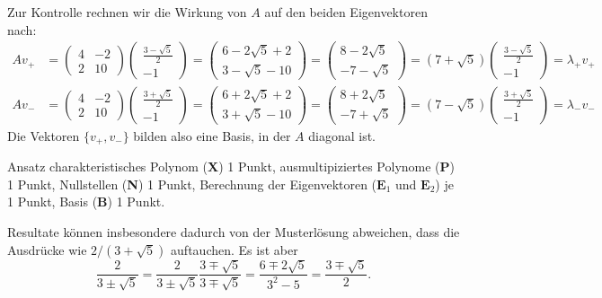 \begin{loesung}
Zur Kontrolle rechnen wir die Wirkung von $A$ auf den beiden Eigenvektoren
nach:
\begin{align*}
Av_+
&=
\begin{pmatrix}4&-2\\2&10\end{pmatrix}
\begin{pmatrix}
\frac{3-\sqrt{5}}2\\-1
\end{pmatrix}
=
\begin{pmatrix}
6-2\sqrt{5}+2\\
3-\sqrt{5}-10
\end{pmatrix}
=
\begin{pmatrix}
8-2\sqrt{5}\\
-7-\sqrt{5}
\end{pmatrix}
=
(7+\sqrt{5})
\begin{pmatrix}
\frac{3-\sqrt{5}}2\\
-1
\end{pmatrix}
=
\lambda_+v_+
\\
Av_-
&=
\begin{pmatrix}4&-2\\2&10\end{pmatrix}
\begin{pmatrix}
\frac{3+\sqrt{5}}2\\-1
\end{pmatrix}
=
\begin{pmatrix}
6+2\sqrt{5}+2\\
3+\sqrt{5}-10
\end{pmatrix}
=
\begin{pmatrix}
8+2\sqrt{5}\\
-7+\sqrt{5}
\end{pmatrix}
=
(7-\sqrt{5})
\begin{pmatrix}
\frac{3+\sqrt{5}}2\\
-1
\end{pmatrix}
=
\lambda_-v_-
\end{align*}
Die Vektoren $\{v_+,v_-\}$ bilden also eine Basis, in der $A$ diagonal ist.
\end{loesung}

\begin{bewertung}
Ansatz charakteristisches Polynom ({\bf X}) 1 Punkt,
ausmultipiziertes Polynome ({\bf P}) 1 Punkt,
Nullstellen ({\bf N}) 1 Punkt,
Berechnung der Eigenvektoren ($\textbf{E}_1$ und $\textbf{E}_2$) je 1 Punkt,
Basis ({\bf B}) 1 Punkt.
\end{bewertung}

\begin{diskussion}
Resultate können insbesondere dadurch von der Musterlösung abweichen,
dass die Ausdrücke wie $2/(3+\sqrt{5})$ auftauchen. Es ist aber
\[
\frac{2}{3\pm \sqrt{5}}
=
\frac{2}{3\pm \sqrt{5}}\frac{3\mp\sqrt{5}}{3\mp\sqrt{5}}
=
\frac{6\mp2\sqrt{5}}{3^2-5}
=
\frac{3\mp\sqrt{5}}2.
\]
\end{diskussion}

